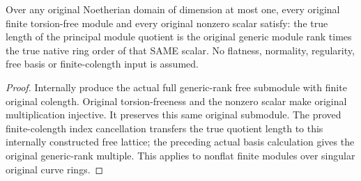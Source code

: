 \begin{theorem}
\label{thm:fc-principal-module-colength-generic-rank}
\leanok
{}
Over any original Noetherian domain of dimension at most one,
every original finite torsion-free module and every original
nonzero scalar satisfy: the true length of the principal module
quotient is the original generic module rank times the true native
ring order of that SAME scalar. No flatness, normality, regularity,
free basis or finite-colength input is assumed.
\end{theorem}
\begin{proof}
Internally produce the actual full generic-rank free submodule with
finite original colength. Original torsion-freeness and the
nonzero scalar make original multiplication injective. It preserves
this same original submodule. The proved finite-colength index
cancellation transfers the true quotient length to this internally
constructed free lattice; the preceding actual basis calculation
gives the original generic-rank multiple. This applies to nonflat
finite modules over singular original curve rings.
\end{proof}
